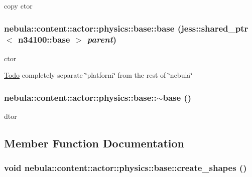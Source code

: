 copy ctor \hypertarget{classnebula_1_1content_1_1actor_1_1physics_1_1base_afd89cccbffae63f75ac2dc601a9a5870}{
\subsubsection[{base}]{\setlength{\rightskip}{0pt plus 5cm}nebula::content::actor::physics::base::base (jess::shared\_\-ptr$<$ {\bf n34100::base} $>$ {\em parent})}}
\label{classnebula_1_1content_1_1actor_1_1physics_1_1base_afd89cccbffae63f75ac2dc601a9a5870}


ctor \begin{Desc}
\item[\hyperlink{todo__todo000001}{Todo}]completely separate \char`\"{}platform\char`\"{} from the rest of \char`\"{}nebula\char`\"{} \end{Desc}
\hypertarget{classnebula_1_1content_1_1actor_1_1physics_1_1base_ac61d7fb5a9b39875b73a4709d20df23e}{
\subsubsection[{$\sim$base}]{\setlength{\rightskip}{0pt plus 5cm}nebula::content::actor::physics::base::$\sim$base ()}}
\label{classnebula_1_1content_1_1actor_1_1physics_1_1base_ac61d7fb5a9b39875b73a4709d20df23e}


dtor 

\subsection{Member Function Documentation}
\hypertarget{classnebula_1_1content_1_1actor_1_1physics_1_1base_acb8de05018a4ca6927706627d9f7c48c}{
\subsubsection[{create\_\-shapes}]{\setlength{\rightskip}{0pt plus 5cm}void nebula::content::actor::physics::base::create\_\-shapes ()}}
\label{classnebula_1_1content_1_1actor_1_1physics_1_1base_acb8de05018a4ca6927706627d9f7c48c}


